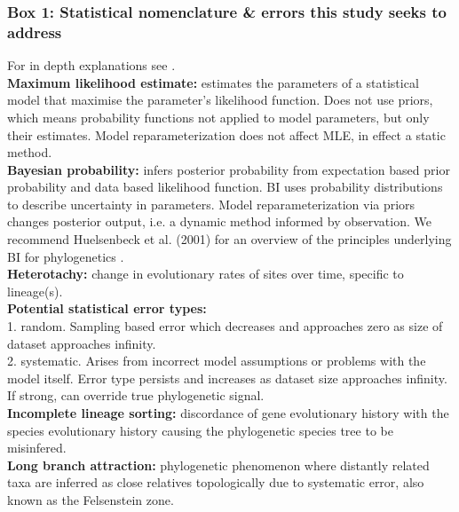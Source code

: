 \documentclass[12pt]{article}
\begin{document}
\subsubsection*{Box 1: Statistical nomenclature \& errors this study seeks to address}
For in depth explanations see \cite{yang2014molecular}.\\
\textbf{Maximum likelihood estimate:} estimates the parameters of a statistical model that maximise the parameter's likelihood function. 
Does not use priors, which means probability functions not applied to model parameters, but only their estimates. 
Model reparameterization does not affect MLE, in effect a static method.\\
\textbf{Bayesian probability:} infers posterior probability from expectation based prior probability and data based likelihood function.
BI uses probability distributions to describe uncertainty in parameters.
Model reparameterization via priors changes posterior output, i.e. a dynamic method informed by observation. 
We recommend Huelsenbeck et al. (2001) for an overview of the principles underlying BI for phylogenetics \cite{huelsenbeck2001bayesian}.\\
\textbf{Heterotachy:} change in evolutionary rates of sites over time, specific to lineage(s).\\
\textbf{Potential statistical error types:}\\
1. random. Sampling based error which decreases and approaches zero as size of dataset approaches infinity.\\
2. systematic. Arises from incorrect model assumptions or problems with the model itself. 
Error type persists and increases as dataset size approaches infinity. 
If strong, can override true phylogenetic signal.\\
\textbf{Incomplete lineage sorting:} discordance of gene evolutionary history with the species evolutionary history causing the phylogenetic species tree to be misinfered.\\
\textbf{Long branch attraction:} phylogenetic phenomenon where distantly related taxa are inferred as close relatives topologically due to systematic error, also known as the Felsenstein zone.
\end{document}
